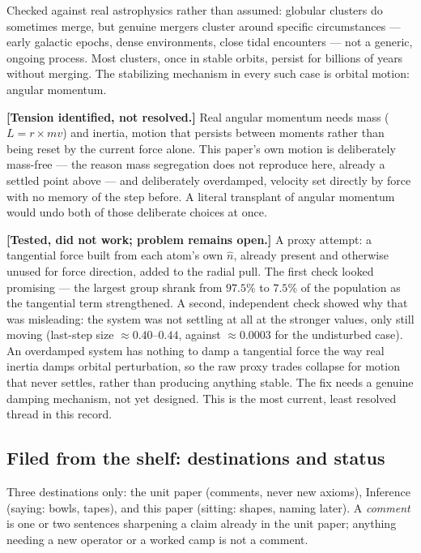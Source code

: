 \documentclass[12pt, a4paper]{article}
\begin{document}
Checked against real astrophysics rather than assumed: globular
clusters do sometimes merge, but genuine mergers cluster around
specific circumstances --- early galactic epochs, dense environments,
close tidal encounters --- not a generic, ongoing process. Most
clusters, once in stable orbits, persist for billions of years
without merging. The stabilizing mechanism in every such case is
orbital motion: angular momentum.

\textbf{[Tension identified, not resolved.]} Real angular momentum
needs mass ($L=r\times mv$) and inertia, motion that persists between
moments rather than being reset by the current force alone. This
paper's own motion is deliberately mass-free --- the reason mass
segregation does not reproduce here, already a settled point above
--- and deliberately overdamped, velocity set directly by force with
no memory of the step before. A literal transplant of angular
momentum would undo both of those deliberate choices at once.

\textbf{[Tested, did not work; problem remains open.]} A proxy
attempt: a tangential force built from each atom's own $\hat n$,
already present and otherwise unused for force direction, added to
the radial pull. The first check looked promising --- the largest
group shrank from $97.5\%$ to $7.5\%$ of the population as the
tangential term strengthened. A second, independent check showed why
that was misleading: the system was not settling at all at the
stronger values, only still moving (last-step size $\approx0.40$--$0.44$,
against $\approx0.0003$ for the undisturbed case). An overdamped
system has nothing to damp a tangential force the way real inertia
damps orbital perturbation, so the raw proxy trades collapse for
motion that never settles, rather than producing anything stable.
The fix needs a genuine damping mechanism, not yet designed. This is
the most current, least resolved thread in this record.



\subsection*{Filed from the shelf: destinations and status}

Three destinations only: the unit paper (comments, never new axioms),
Inference (saying: bowls, tapes), and this paper (sitting: shapes,
naming later). A \emph{comment} is one or two sentences sharpening a
claim already in the unit paper; anything needing a new operator or
a worked camp is not a comment.
\end{document}
